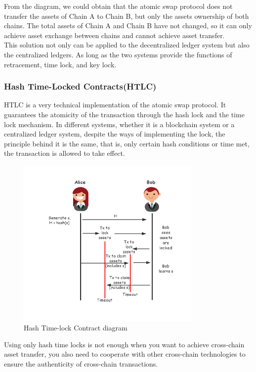 \noindent From the diagram, we could obtain that the atomic swap protocol does not transfer the assets of Chain A to Chain B, but only the assets ownership of both chains. The total assets of Chain A and Chain B have not changed, so it can only achieve asset exchange between chains and cannot achieve asset transfer.\\
\noindent This solution not only can be applied to the decentralized ledger system but also the centralized ledgers. As long as the two systems provide the functions of retracement, time lock, and key lock.

\subsubsection{Hash Time-Locked Contracts(HTLC)}
\noindent HTLC is a very technical implementation of the atomic swap protocol. It guarantees the atomicity of the transaction through the hash lock and the time lock mechanism. In different systems, whether it is a blockchain system or a centralized ledger system, despite the ways of implementing the lock, the principle behind it is the same, that is, only certain hash conditions or time met, the transaction is allowed to take effect.

        \begin{figure}[H]
        \includegraphics[width=0.8\textwidth]{./figures/Hashlock.png}
        \centering
        \caption{Hash Time-lock Contract diagram}%
        \centering
        \label{fig:hash}
        \end{figure}
\noindent Using only hash time locks is not enough when you want to achieve cross-chain asset transfer, you also need to cooperate with other cross-chain technologies to ensure the authenticity of cross-chain transactions.


